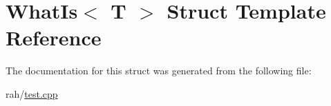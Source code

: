 \hypertarget{struct_what_is}{}\section{What\+Is$<$ T $>$ Struct Template Reference}
\label{struct_what_is}


The documentation for this struct was generated from the following file\+:\begin{DoxyCompactItemize}
\item 
rah/\mbox{\hyperlink{test_8cpp}{test.\+cpp}}\end{DoxyCompactItemize}
